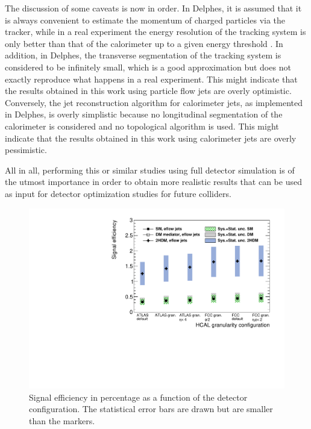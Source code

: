 The discussion of some caveats is now in order. In Delphes, it is assumed that it is always convenient to estimate the momentum of charged particles via the tracker, while in a real experiment the energy resolution of the tracking system is only better than that of the calorimeter up to a given energy threshold \cite{Delphes}. In addition, in Delphes, the transverse segmentation of the tracking system is considered to be infinitely small, which is a good approximation but does not exactly reproduce what happens in a real experiment. This might indicate that the results obtained in this work using particle flow jets are overly optimistic. Conversely, the jet reconstruction algorithm for calorimeter jets, as implemented in Delphes, is overly simplistic because no longitudinal segmentation of the calorimeter is considered and no topological algorithm is used. This might indicate that the results obtained in this work using calorimeter jets are overly pessimistic.

All in all, performing this or similar studies using full detector simulation is of the utmost importance in order to obtain more realistic results that can be used as input for detector optimization studies for future colliders.

\begin{figure}[h]
	\centering
	\includegraphics[width=\linewidth]{./images/EffvsGran_PFjets_Opt.pdf}
	\caption{Signal efficiency in percentage as a function of the detector configuration. The statistical error bars are drawn but are smaller than the markers.}
	\label{fig:eff_gran}
\end{figure}

